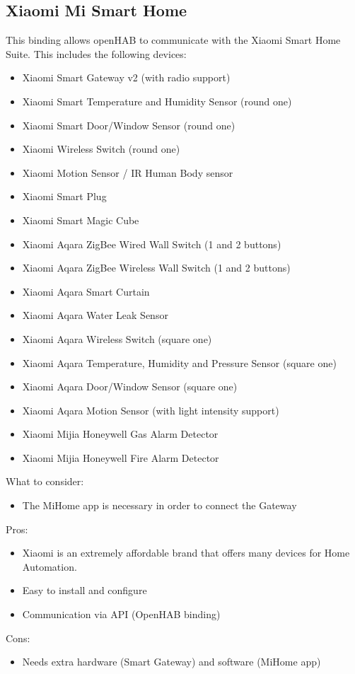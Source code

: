 \subsection{Xiaomi Mi Smart Home}

This binding allows openHAB to communicate with the Xiaomi Smart Home Suite. This includes the following devices:
\begin{itemize}
	\item Xiaomi Smart Gateway v2 (with radio support)
	\item Xiaomi Smart Temperature and Humidity Sensor (round one)
	\item Xiaomi Smart Door/Window Sensor (round one)
	\item Xiaomi Wireless Switch (round one)
	\item Xiaomi Motion Sensor / IR Human Body sensor
	\item Xiaomi Smart Plug
	\item Xiaomi Smart Magic Cube
	\item Xiaomi Aqara ZigBee Wired Wall Switch (1 and 2 buttons)
	\item Xiaomi Aqara ZigBee Wireless Wall Switch (1 and 2 buttons)
	\item Xiaomi Aqara Smart Curtain
	\item Xiaomi Aqara Water Leak Sensor
	\item Xiaomi Aqara Wireless Switch (square one)
	\item Xiaomi Aqara Temperature, Humidity and Pressure Sensor (square one)
	\item Xiaomi Aqara Door/Window Sensor (square one)
	\item Xiaomi Aqara Motion Sensor (with light intensity support)
	\item Xiaomi Mijia Honeywell Gas Alarm Detector
	\item Xiaomi Mijia Honeywell Fire Alarm Detector
\end{itemize}
What to consider:
\begin{itemize}
	\item The MiHome app is necessary in order to connect the Gateway
\end{itemize}
Pros:
\begin{itemize}
	\item Xiaomi is an extremely affordable brand that offers many devices for Home Automation. 
	\item Easy to install and configure
	\item Communication via API (OpenHAB binding)
\end{itemize}
Cons:
\begin{itemize}
	\item Needs extra hardware (Smart Gateway) and software (MiHome app)
\end{itemize}

